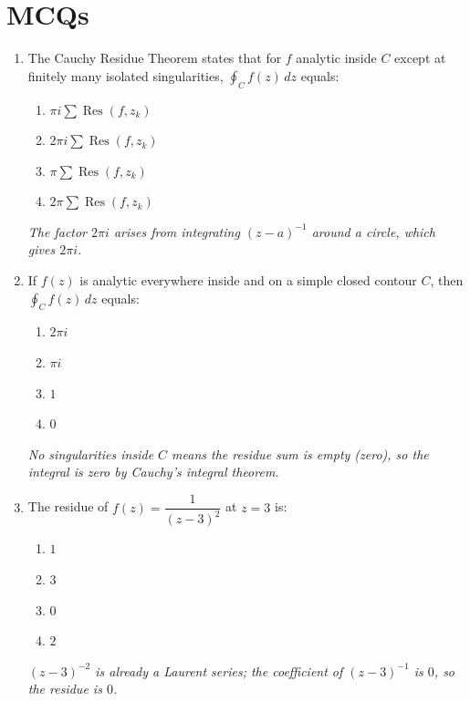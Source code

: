 \documentclass[12pt,a4paper]{article}
\begin{document}
\section{MCQs}

\begin{enumerate}[label=\textbf{MCQ \arabic*.}, leftmargin=*]

\item The Cauchy Residue Theorem states that for $f$ analytic inside $C$ except
  at finitely many isolated singularities,
  $\oint_C f(z)\,dz$ equals:
  \begin{enumerate}[label=(\alph*)]
    \item $\pi i \sum \operatorname{Res}(f,z_k)$
    \item \textbf{$2\pi i \sum \operatorname{Res}(f,z_k)$}
    \item $\pi \sum \operatorname{Res}(f,z_k)$
    \item $2\pi \sum \operatorname{Res}(f,z_k)$
  \end{enumerate}
  \textit{The factor $2\pi i$ arises from integrating $(z-a)^{-1}$ around a
  circle, which gives $2\pi i$.}

\item If $f(z)$ is analytic everywhere inside and on a simple closed contour $C$,
  then $\oint_C f(z)\,dz$ equals:
  \begin{enumerate}[label=(\alph*)]
    \item $2\pi i$
    \item $\pi i$
    \item $1$
    \item \textbf{$0$}
  \end{enumerate}
  \textit{No singularities inside $C$ means the residue sum is empty (zero), so
  the integral is zero by Cauchy's integral theorem.}

\item The residue of $f(z) = \dfrac{1}{(z-3)^2}$ at $z=3$ is:
  \begin{enumerate}[label=(\alph*)]
    \item $1$
    \item $3$
    \item \textbf{$0$}
    \item $2$
  \end{enumerate}
  \textit{$(z-3)^{-2}$ is already a Laurent series; the coefficient of $(z-3)^{-1}$
  is $0$, so the residue is $0$.}


\end{enumerate}
\end{document}

